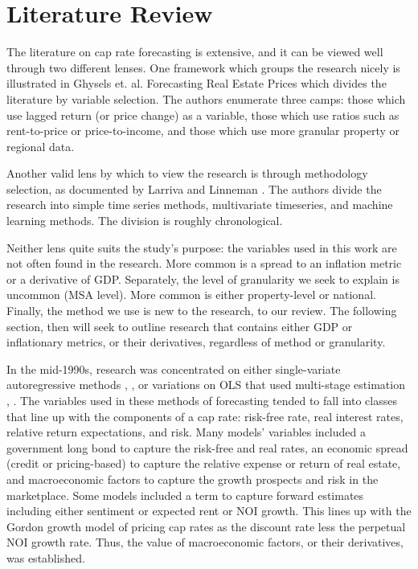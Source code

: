 \label{intro}


\section{Literature Review}

The literature on cap rate forecasting is extensive, and it can be viewed well through two different lenses. One framework which groups the research nicely is illustrated in Ghysels et. al. Forecasting Real Estate Prices \citep*{ghysels_plazzi_valkanov_torous_2013} which divides the literature by variable selection. The authors enumerate three camps: those which use lagged return (or price change) as a variable, those which use ratios such as rent-to-price or price-to-income, and those which use more granular property or regional data. 

Another valid lens by which to view the research is through methodology selection, as documented by Larriva and Linneman \citep*{larriva2021determinants}. The authors divide the research into simple time series methods, multivariate timeseries, and machine learning methods. The division is roughly chronological. 

Neither lens quite suits the study's purpose: the variables used in this work are not often found in the research. More common is a spread to an inflation metric or a derivative of GDP. Separately, the level of granularity we seek to explain is uncommon (MSA level). More common is either property-level or national. Finally, the method we use is new to the research, to our review. The following section, then will seek to outline research that contains either GDP or inflationary metrics, or their derivatives, regardless of method or granularity.

In the mid-1990s, research was concentrated on either single-variate autoregressive methods \citep*{gau_1984}, \citep*{gau_1985}, \citep*{linneman_1986} or variations on OLS that used multi-stage estimation \citep*{case_shiller_1990}, \citep*{abraham_hendershott_1994}. The variables used in these methods of forecasting tended to fall into classes that line up with the components of a cap rate: risk-free rate, real interest rates, relative return expectations, and risk. Many models’ variables included a government long bond  to capture the risk-free and real rates, an economic spread (credit or pricing-based) to capture the relative expense or return of real estate, and macroeconomic factors to capture the  growth prospects and risk in the marketplace. Some models included a term to capture forward estimates including either sentiment or expected rent or NOI growth. This lines up with the Gordon growth model of pricing cap rates as the discount rate less the perpetual NOI growth rate. Thus, the value of macroeconomic factors, or their derivatives, was established.

